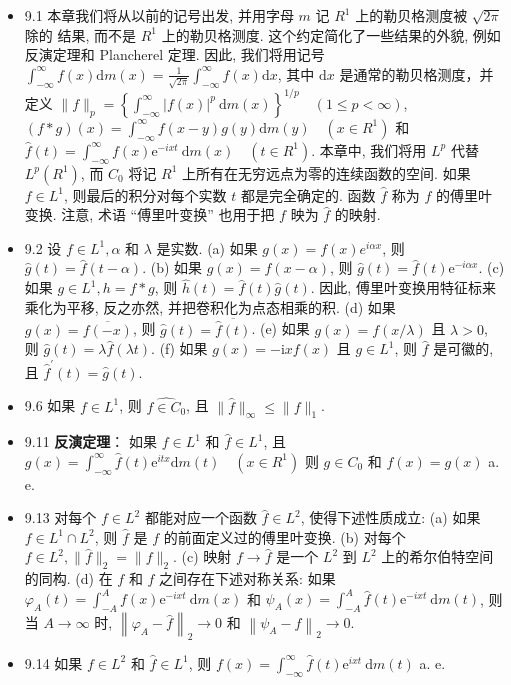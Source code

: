 \begin{itemize}
\item 9.1 本章我们将从以前的记号出发, 并用字母 $m$ 记 $R^{1}$ 上的勒贝格测度被 $\sqrt{2 \pi}$ 除的 结果, 而不是 $R^{1}$ 上的勒贝格测度. 这个约定简化了一些结果的外貌, 例如反演定理和 Plancherel 定理. 因此, 我们将用记号 $\int_{-\infty}^{\infty} f(x) \mathrm{d} m(x)=\frac{1}{\sqrt{2 \pi}} \int_{-\infty}^{\infty} f(x) \mathrm{d} x$, 其中 $\mathrm{d} x$ 是通常的勒贝格测度，并定义 $\|f\|_{p}=\left\{\int_{-\infty}^{\infty}|f(x)|^{p} \mathrm{~d} m(x)\right\}^{1 / p} \quad(1 \leqslant p<\infty)$, $(f * g)(x)=\int_{-\infty}^{\infty} f(x-y) g(y) \mathrm{d} m(y) \quad\left(x \in R^{1}\right)$ 和 $\hat{f}(t)=\int_{-\infty}^{\infty} f(x) \mathrm{e}^{-i xt} \mathrm{~d} m(x) \quad\left(t \in R^{1}\right)$. 本章中, 我们将用 $L^{p}$ 代替 $L^{p}\left(R^{1}\right)$, 而 $C_{0}$ 将记 $R^{1}$ 上所有在无穷远点为零的连续函数的空间. 如果 $f \in L^{1}$, 则最后的积分对每个实数 $t$ 都是完全确定的. 函数 $\hat{f}$ 称为 $f$ 的傅里叶变换. 注意, 术语 “傅里叶变换” 也用于把 $f$ 映为 $\hat{f}$ 的映射.

\item 9.2 设 $f \in L^{1}, \alpha$ 和 $\lambda$ 是实数. (a) 如果 $g(x)=f(x) e^{i \alpha x}$, 则 $\hat{g}(t)=\hat{f}(t-\alpha)$. (b) 如果 $g(x)=f(x-\alpha)$, 则 $\hat{g}(t)=\hat{f}(t) \mathrm{e}^{-i\alpha x}$. (c) 如果 $g \in L^{1}, h=f * g$, 则 $\hat{h}(t)=\hat{f}(t) \hat{g}(t)$. 因此, 傅里叶变换用特征标来乘化为平移, 反之亦然, 并把卷积化为点态相乘的积. (d) 如果 $g(x)=\overline{f(-x)}$, 则 $\hat{g}(t)=\overline{\hat{f}(t)}$. (e) 如果 $g(x)=f(x / \lambda)$ 且 $\lambda>0$, 则 $\hat{g}(t)=\lambda \hat{f}(\lambda t)$. (f) 如果 $g(x)=-\mathrm{i} x f(x)$ 且 $g \in L^{1}$, 则 $\hat{f}$ 是可徽的, 且 $\hat{f}^{\prime}(t)=\hat{g}(t)$.

\item 9.6 如果 $f \in L^{1}$, 则 $\hat{f \in C_{0}}$, 且 $\|\hat{f}\|_{\infty} \leqslant\|f\|_{1}$.

\item 9.11 \textbf{反演定理}： 如果 $f \in L^{1}$ 和 $\hat{f} \in L^{1}$, 且 $g(x)=\int_{-\infty}^{\infty} \hat{f}(t) \mathrm{e}^{itx} \mathrm{d} m(t) \quad\left(x \in R^{1}\right)$ 则 $g \in C_{0}$ 和 $f(x)=g(x)$ a. e.

\item 9.13 对每个 $f \in L^{2}$ 都能对应一个函数 $\hat{f} \in L^{2}$, 使得下述性质成立: (a) 如果 $f \in L^{1} \cap L^{2}$, 则 $\hat{f}$ 是 $f$ 的前面定义过的傅里叶变换. (b) 对每个 $f \in L^{2},\|\hat{f}\|_{2}=\|f\|_{2}$. (c) 映射 $f \rightarrow \hat{f}$ 是一个 $L^{2}$ 到 $L^{2}$ 上的希尔伯特空间的同构. (d) 在 $f$ 和 $\hat{f}$ 之间存在下述对称关系: 如果 $\varphi_{A}(t)=\int_{-A}^{A} f(x) \mathrm{e}^{-ixt} \mathrm{~d} m(x)$ 和 $\psi_{A}(x)=\int_{-A}^{A} \hat{f}(t) \mathrm{e}^{-ix t} \mathrm{~d} m(t)$, 则当 $A \rightarrow \infty$ 时, $\left\|\varphi_{A}-\hat{f}\right\|_{2} \rightarrow 0$ 和 $\left\|\psi_{A}-f\right\|_{2} \rightarrow 0$.

\item 9.14 如果 $f \in L^{2}$ 和 $\hat{f} \in L^{1}$, 则 $f(x)=\int_{-\infty}^{\infty} \hat{f}(t) \mathrm{e}^{i x t} \mathrm{~d} m(t)$ a. e.
\end{itemize}


